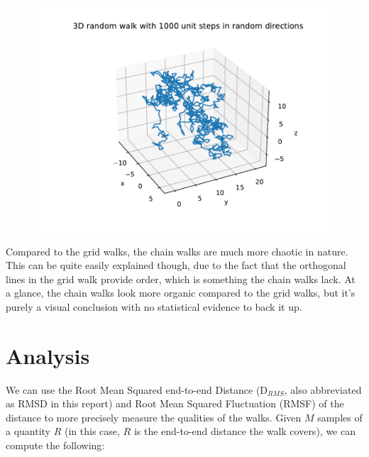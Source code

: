 \documentclass[a4paper,12pt]{article}
\begin{document}
\begin{figure}[!ht]
\begin{minipage}{0.49\textwidth}
  \end{minipage}
  \includegraphics[scale=0.49]{img/1-chain-1000.pdf}
\end{figure}

\FloatBarrier

Compared to the grid walks, the chain walks are much more chaotic in nature. This can be quite easily explained
though, due to the fact that the orthogonal lines in the grid walk provide order, which is something the chain
walks lack. At a glance, the chain walks look more organic compared to the grid walks, but it's purely a visual
conclusion with no statistical evidence to back it up.

\section*{Analysis}

We can use the Root Mean Squared end-to-end Distance ($\mathrm{D}_{RMS}$, also abbreviated as RMSD in this report)
and Root Mean Squared Fluctuation (RMSF) of the distance to more precisely measure the qualities of the walks.
Given $M$ samples of a quantity $R$ (in this case, $R$ is the end-to-end distance the walk covers), we can compute
the following:
\end{document}
